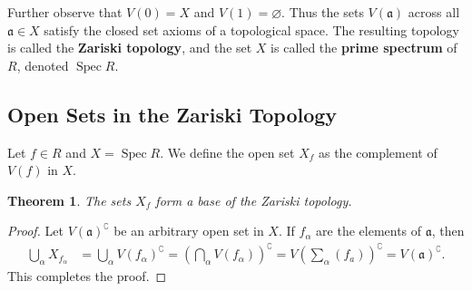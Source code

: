 \documentclass[11pt]{article}
\newtheorem{theorem}{Theorem}
\newcommand{\Spec}{\operatorname{Spec}}
\begin{document}
Further observe that $V(0) = X$ and $V(1) = \varnothing$. Thus the sets $V(\mathfrak{a})$ across all $\mathfrak{a} \in X$ satisfy the closed set axioms of a topological space. The resulting topology is called the \textbf{Zariski topology}, and the set $X$ is called the \textbf{prime spectrum} of $R$, denoted $\Spec R$.


\subsection{Open Sets in the Zariski Topology}

Let $f \in R$ and $X = \Spec R$. We define the open set $X_{f}$ as the complement of $V(f)$ in $X$.

\begin{adjustwidth}{0.5cm}{}
  \begin{theorem}
    The sets $X_{f}$ form a base of the Zariski topology.
  \end{theorem}
  \begin{proof}
    Let $V(\mathfrak{a})^{\complement}$ be an arbitrary open set in $X$. If $f_{\alpha}$ are the elements of $\mathfrak{a}$, then
    \begin{align*}
      \bigcup\limits_{\alpha} X_{f_{\alpha}} &= \bigcup\limits_{\alpha} V(f_{\alpha})^{\complement} = \left( \bigcap\limits_{\alpha} V(f_{\alpha}) \right)^{\complement} = V \left( \sum\limits_{\alpha} (f_{a})  \right)^{\complement} = V(\mathfrak{a})^{\complement}.
    \end{align*}
    This completes the proof.
  \end{proof} 
\end{adjustwidth}
\end{document}
